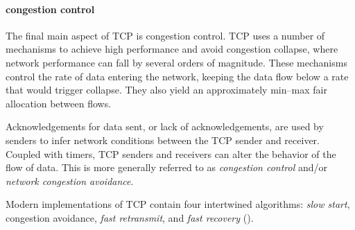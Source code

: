 \paragraph{congestion control}
The final main aspect of \acs{TCP} is congestion control.
\acs{TCP} uses a number of mechanisms to achieve high performance and avoid congestion collapse, where network performance can fall by several orders of magnitude.
These mechanisms control the rate of data entering the network, keeping the data flow below a rate that would trigger collapse.
They also yield an approximately min--max fair allocation between flows.

Acknowledgements for data sent, or lack of acknowledgements, are used by senders to infer network conditions between the \acs{TCP} sender and receiver.
Coupled with timers, \acs{TCP} senders and receivers can alter the behavior of the flow of data.
This is more generally referred to as \emph{congestion control} and/or \emph{network congestion avoidance}.

Modern implementations of \acs{TCP} contain four intertwined algorithms: \emph{slow start}, congestion avoidance, \emph{fast retransmit}, and \emph{fast recovery} ().

